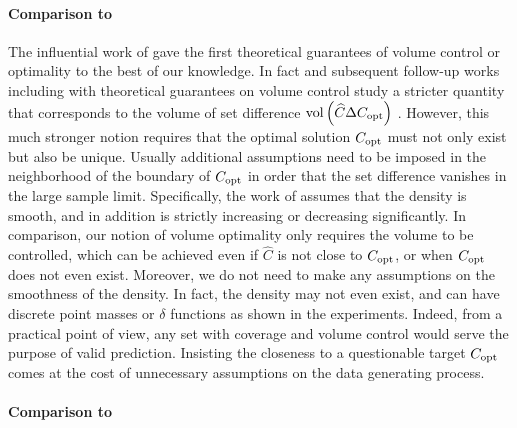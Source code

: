 \fi

\paragraph{Comparison to \citet{Lei2013DistributionFreePS}} 
The influential work of \citet{Lei2013DistributionFreePS}  gave the first theoretical guarantees of volume control or optimality to the best of our knowledge. 
In fact \citet{Lei2013DistributionFreePS} and subsequent follow-up works including \citet{Sadinle2016LeastAS, chernozhukov2021distributional} with theoretical guarantees on volume control study a stricter quantity that corresponds to the volume of set difference $\mathrm{vol}\left(\widehat{C}\Delta C_{\rm opt}\right)$ \citep{Lei2013DistributionFreePS,Sadinle2016LeastAS, chernozhukov2021distributional}. However, this much stronger notion requires that the optimal solution $C_{\rm opt}$ must not only exist but also be unique. Usually additional assumptions need to be imposed in the neighborhood of the boundary of $C_{\rm opt}$ in order that the set difference vanishes in the large sample limit. 
Specifically, the work of \citep{Lei2013DistributionFreePS} assumes that the density is smooth, and in addition is strictly increasing or decreasing significantly. 
In comparison, our notion of volume optimality only requires the volume to be controlled, which can be achieved even if $\widehat{C}$ is not close to $C_{\rm opt}$, or when $C_{\rm opt}$ does not even exist. 
Moreover, we do not need to make any assumptions on the smoothness of the density. In fact, the density may not even exist, and can have discrete point masses or $\delta$ functions as shown in the experiments. Indeed, from a practical point of view, any set with coverage and volume control would serve the purpose of valid prediction. Insisting the closeness to a questionable target $C_{\rm opt}$ comes at the cost of unnecessary assumptions on the data generating process.

\paragraph{Comparison to \citet{izbicki2020flexible,izbicki2022cd}}

